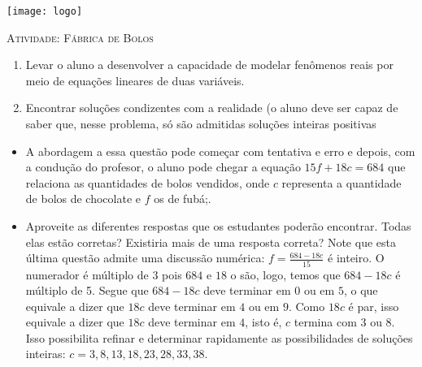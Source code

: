\documentclass[10 pt,usenames,dvipsnames, oneside]{article}
\begin{document}
\begin{center}
  \begin{minipage}[l]{3cm}
\texttt{[image: logo]}    
\end{minipage}\hfill
\begin{minipage}[r]{.8\textwidth}
 {\Large \scshape Atividade: Fábrica de Bolos}  
\end{minipage}
\end{center}
\vspace{.2cm}

\ifdefined\prof

\begin{goals}
\begin{enumerate}
\item Levar o aluno a desenvolver a capacidade de modelar fenômenos reais por meio de equações lineares de duas variáveis.
\item Encontrar soluções condizentes com a realidade (o aluno deve ser capaz de saber que, nesse problema, só são admitidas soluções inteiras positivas
\end{enumerate}

\tcblower

\begin{itemize}
\item A abordagem a essa questão pode começar com tentativa  e erro e depois, com a condução do profesor, o aluno pode chegar a equação $15f+18c=684$ que relaciona as quantidades de bolos vendidos, onde $c$ representa a quantidade de bolos de chocolate e $f$ os de fubá;.
\item Aproveite as diferentes respostas que os estudantes poderão encontrar. Todas elas estão corretas? Existiria mais de uma resposta correta? Note que esta última questão admite uma discussão numérica:
$f=\frac{684-18c}{15}$ é inteiro. O numerador é múltiplo de $3$ pois $684$ e $18$ o são, logo, temos que $684 -18c$ é múltiplo de 5. Segue que $684-18c$ deve terminar em $0$ ou em $5$, o que equivale a dizer que $18c$ deve terminar em $4$ ou em $9$. Como $18c$ é par,  isso equivale a dizer que $18c$ deve terminar em $4$, isto é, $c$ termina com $3$ ou $8$. Isso possibilita refinar e determinar rapidamente as possibilidades de soluções inteiras: $c = 3, 8, 13, 18, 23, 28, 33, 38.$
\end{itemize}
\end{goals}
\end{document}
